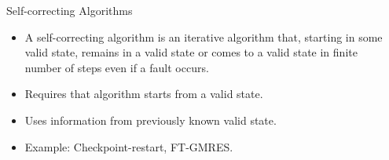 \lyxframeend{}

\begin{columns}
\begin{column}{0.5\textwidth}

\end{column}
\begin{column}{0.5\textwidth}
\begin{block}{Self-correcting Algorithms}
\begin{itemize}
\item A self-correcting algorithm is an iterative algorithm that, starting in some valid state, remains in a valid state or comes to a valid state in finite number of steps even if a fault occurs.
\item Requires that algorithm starts from a valid state. 
\item Uses information from previously known valid state.
\item Example: Checkpoint-restart, FT-GMRES. 

\end{itemize}
\end{block}
\end{column}
\end{columns}



